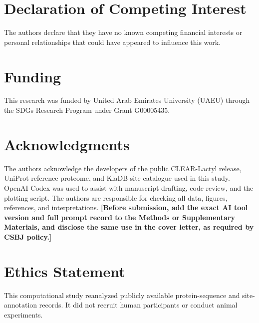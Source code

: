 \documentclass[twocolumn]{article}
\begin{document}
\section*{Declaration of Competing Interest}
The authors declare that they have no known competing financial interests
or personal relationships that could have appeared to influence this work.

\section*{Funding}
This research was funded by United Arab Emirates University (UAEU)
through the SDGs Research Program under Grant G00005435.

\section*{Acknowledgments}
The authors acknowledge the developers of the public CLEAR-Lactyl release,
UniProt reference proteome, and KlaDB site catalogue used in this study.
OpenAI Codex was used to assist with manuscript drafting, code review, and
the plotting script. The authors are responsible for checking all data,
figures, references, and interpretations. \textbf{[Before submission, add
the exact AI tool version and full prompt record to the Methods or
Supplementary Materials, and disclose the same use in the cover letter,
as required by CSBJ policy.]}

\section*{Ethics Statement}
This computational study reanalyzed publicly available protein-sequence
and site-annotation records. It did not recruit human participants or
conduct animal experiments.



\end{document}
